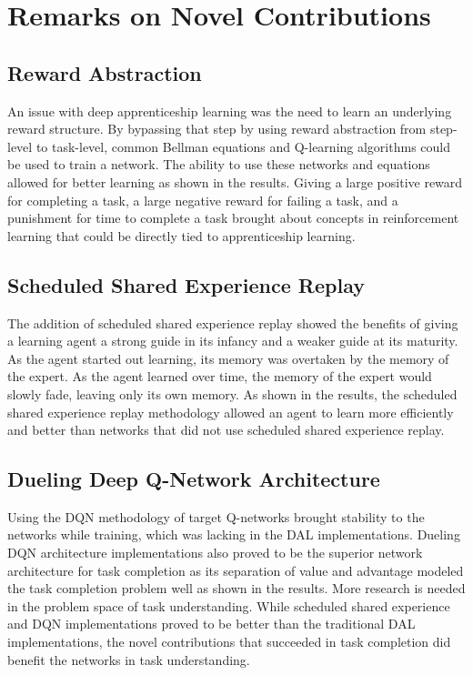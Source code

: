 \documentclass[12pt,american]{report}
\begin{document}
\section{Remarks on Novel Contributions}
\subsection{Reward Abstraction}
An issue with deep apprenticeship learning was the need to learn an underlying reward structure.  By bypassing that step by using reward abstraction from step-level to task-level, common Bellman equations and Q-learning algorithms could be used to train a network.  The ability to use these networks and equations allowed for better learning as shown in the results.  Giving a large positive reward for completing a task, a large negative reward for failing a task, and a punishment for time to complete a task brought about concepts in reinforcement learning that could be directly tied to apprenticeship learning.

\subsection{Scheduled Shared Experience Replay}
The addition of scheduled shared experience replay showed the benefits of giving a learning agent a strong guide in its infancy and a weaker guide at its maturity.  As the agent started out learning, its memory was overtaken by the memory of the expert. As the agent learned over time, the memory of the expert would slowly fade, leaving only its own memory.  As shown in the results, the scheduled shared experience replay methodology allowed an agent to learn more efficiently and better than networks that did not use scheduled shared experience replay.

\subsection{Dueling Deep Q-Network Architecture}
Using the DQN methodology of target Q-networks brought stability to the networks while training, which was lacking in the DAL implementations.  Dueling DQN architecture implementations also proved to be the superior network architecture for task completion as its separation of value and advantage modeled the task completion problem well as shown in the results. More research is needed in the problem space of task understanding.  While scheduled shared experience and DQN implementations proved to be better than the traditional DAL implementations, the novel contributions that succeeded in task completion did benefit the networks in task understanding.
\end{document}
